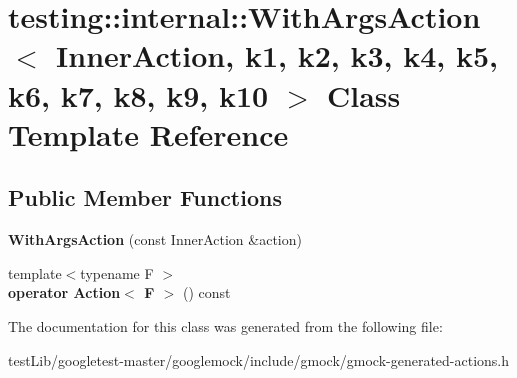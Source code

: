 \hypertarget{classtesting_1_1internal_1_1WithArgsAction}{}\section{testing\+:\+:internal\+:\+:With\+Args\+Action$<$ Inner\+Action, k1, k2, k3, k4, k5, k6, k7, k8, k9, k10 $>$ Class Template Reference}
\label{classtesting_1_1internal_1_1WithArgsAction}
\subsection*{Public Member Functions}
\begin{DoxyCompactItemize}
\item 
\mbox{\label{classtesting_1_1internal_1_1WithArgsAction_ab408f9c56c8f25564ef554b984e1c926}} 
{\bfseries With\+Args\+Action} (const Inner\+Action \&action)
\item 
\mbox{\label{classtesting_1_1internal_1_1WithArgsAction_ab6d8f89fd5a54f2914da2523b2ba6ee5}} 
{\footnotesize template$<$typename F $>$ }\\{\bfseries operator Action$<$ F $>$} () const
\end{DoxyCompactItemize}


The documentation for this class was generated from the following file\+:\begin{DoxyCompactItemize}
\item 
test\+Lib/googletest-\/master/googlemock/include/gmock/gmock-\/generated-\/actions.\+h\end{DoxyCompactItemize}
